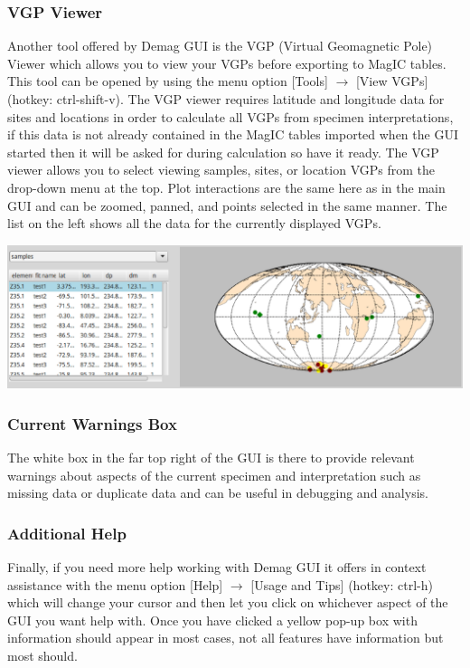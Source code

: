 \documentclass[11pt]{book}
\begin{document}
{\subsubsection{VGP Viewer}\label{vgp-view}

Another tool offered by Demag GUI is the VGP (Virtual Geomagnetic Pole) Viewer which allows you to view your VGPs before exporting to MagIC tables. This tool can be opened by using the menu option [Tools] $\rightarrow$ [View VGPs] (hotkey: ctrl-shift-v). The VGP viewer requires latitude and longitude data for sites and locations in order to calculate all VGPs from specimen interpretations, if this data is not already contained in the MagIC tables imported when the GUI started then it will be asked for during calculation so have it ready. The VGP viewer allows you to select viewing samples, sites, or location VGPs from the drop-down menu at the top. Plot interactions are the same here as in the main GUI and can be zoomed, panned, and points selected in the same manner. The list on the left shows all the data for the currently displayed VGPs.

\includegraphics[width=15 cm]{EPSFiles/demag_gui_VGPViewer.eps}

\subsubsection{Current Warnings Box}\label{warn-box}

The white box in the far top right of the GUI is there to provide relevant warnings about aspects of the current specimen and interpretation such as missing data or duplicate data and can be useful in debugging and analysis.

\subsubsection{Additional Help}\label{add-help}

Finally, if you need more help working with Demag GUI it offers in context assistance with the menu option [Help] $\rightarrow$ [Usage and Tips] (hotkey: ctrl-h) which will change your cursor and then let you click on whichever aspect of the GUI you want help with. Once you have clicked a yellow pop-up box with information should appear in most cases, not all features have information but most should.

}
\end{document}
